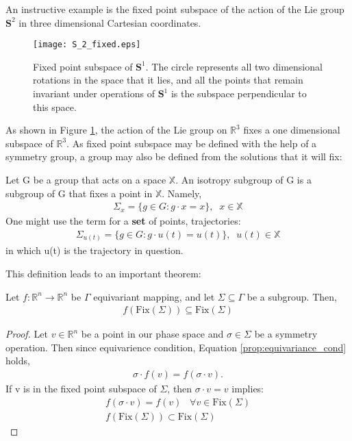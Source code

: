 An instructive example is the fixed point subspace of the action of the Lie group $\mathbf{S}^2$ in three dimensional Cartesian coordinates. 

\begin{figure}[H]
\center
\texttt{[image: S\_2\_fixed.eps]}
\label{fig:s1_fixed}
\caption[Fixed point subspace of $\mathbf{S}^1$]{Fixed point subspace of $\mathbf{S}^1$. The circle represents all two dimensional rotations in the space that it lies, and all the points that remain invariant under operations of $\mathbf{S}^1$ is the subspace perpendicular to this space.}
\end{figure}

As shown in Figure \ref{fig:s1_fixed}, the action of the Lie group on $\mathbb{R}^3$ fixes a one dimensional subspace of $\mathbb{R}^3$. As fixed point subspace may be defined with the help of a symmetry group, a group may also be defined from the solutions that it will fix:
%
\begin{definition}
\label{def:isotropy_subgroup}
Let G be a group that acts on a space $\mathbb{X}$.
An isotropy subgroup of G is a subgroup of G that fixes a point in $\mathbb{X}$.\cite{golubitsky_symmetry_2003,scholarpedia_dynamical_systems}
Namely,
\begin{align}
\Sigma_x = \{g \in G: g\cdot x = x \} ,\;\;  x \in \mathbb{X}
\end{align}
One might use the term for a \textbf{set} of points, trajectories:
\begin{align}
\Sigma_{u(t)} = \{g \in G: g\cdot u(t) = u(t) \} ,\;\;  u(t) \in \mathbb{X}
\end{align}
in which u(t) is the trajectory in question.
\end{definition}
%
This definition leads to an important theorem:
%
\begin{theorem}
\label{thm:flow_invariance}
Let $f: \mathbb{R}^n \rightarrow \mathbb{R}^n$ be $\Gamma$ equivariant mapping, and let $\Sigma \subseteq \Gamma$ be a subgroup.\cite{golubitsky_symmetry_2003}
Then,
\begin{align}
f(\text{Fix}(\Sigma)) \subseteq \text{Fix}(\Sigma)
\end{align}
\end{theorem}
%
\begin{proof}
Let $v \in \mathbb{R}^n$ be a point in our phase space and $\sigma \in \Sigma$
be a symmetry operation. Then since equivarience condition, Equation \ref{prop:equivariance_cond} holds,
\begin{align}
\sigma \cdot f(v) = f(\sigma \cdot v).
\end{align}
If v is in the fixed point subspace of $\Sigma$, then $\sigma \cdot v = v$ implies:
\begin{align}
f(\sigma \cdot v) = f(v) \;\;\; \forall v \in \text{Fix}(\Sigma)\\
f(\text{Fix}(\Sigma)) \subset \text{Fix}(\Sigma)
\end{align}
\end{proof}
